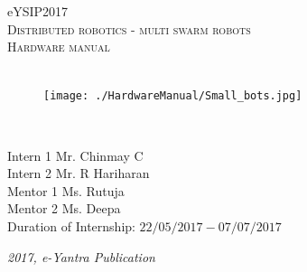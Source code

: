 \documentclass[a4paper,12pt,oneside]{book}
\begin{document}
\begin{titlepage}
	\raggedright
	{\Large eYSIP2017\\[1cm]}
	{\Huge\scshape\centering Distributed robotics - multi swarm robots \\ Hardware manual\\[.1in]}
	\vfill
		\hfill\\
	\begin{figure}[h!]
		\texttt{[image: ./HardwareManual/Small\_bots.jpg]}		
	\end{figure}	
	\hfill\\
	\begin{flushright}
		{\large Intern 1 Mr. Chinmay C \\}
		{\large Intern 2 Mr. R Hariharan \\}
		{\large Mentor 1 Ms. Rutuja \\}
		{\large Mentor 2 Ms. Deepa \\}
		{\large Duration of Internship: $ 22/05/2017-07/07/2017 $ \\}
	\end{flushright}
	
	{\itshape 2017, e-Yantra Publication}
\end{titlepage}
	
\tableofcontents
\end{document}

